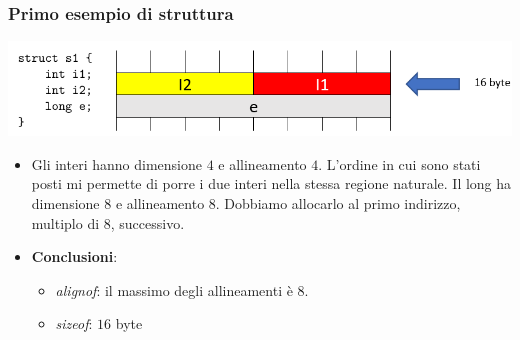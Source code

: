 \documentclass[11pt]{report}
\theoremstyle{definition}
\begin{document}
\subsubsection{Primo esempio di struttura}
\begin{center}
\includegraphics[scale=0.80]{img/16.PNG}
\end{center} 
\begin{itemize}
\item Gli interi hanno dimensione $4$ e allineamento $4$. L'ordine in cui sono stati posti mi permette di porre i due interi nella stessa regione naturale. Il long ha dimensione $8$ e allineamento $8$. Dobbiamo allocarlo al primo indirizzo, multiplo di 8, successivo. 
\item \textbf{Conclusioni}:\begin{itemize}
\item \emph{alignof}: il massimo degli allineamenti è $8$.
\item \emph{sizeof}: $16$ byte
\end{itemize}
\end{itemize}
\end{document}
